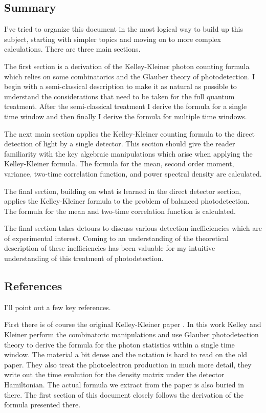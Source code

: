 \documentclass[12pt]{article}
\begin{document}
\subsection{Summary}

I've tried to organize this document in the most logical way to build up this subject, starting with simpler topics and moving on to more complex calculations. There are three main sections. 

The first section is a derivation of the Kelley-Kleiner photon counting formula which relies on some combinatorics and the Glauber theory of photodetection. I begin with a semi-classical description to make it as natural as possible to understand the considerations that need to be taken for the full quantum treatment. After the semi-classical treatment I derive the formula for a single time window and then finally I derive the formula for multiple time windows.

The next main section applies the Kelley-Kleiner counting formula to the direct detection of light by a single detector. This section should give the reader familiarity with the key algebraic manipulations which arise when applying the Kelley-Kleiner formula. The formula for the mean, second order moment, variance, two-time correlation function, and power spectral density are calculated.

The final section, building on what is learned in the direct detector section, applies the Kelley-Kleiner formula to the problem of balanced photodetection. The formula for the mean and two-time correlation function is calculated.

The final section takes detours to discuss various detection inefficiencies which are of experimental interest. Coming to an understanding of the theoretical description of these inefficiencies has been valuable for my intuitive understanding of this treatment of photodetection.

\subsection{References}

I'll point out a few key references.

First there is of course the original Kelley-Kleiner paper \cite{Kelley1964}. In this work Kelley and Kleiner perform the combinatoric manipulations and use Glauber photodetection theory \cite{Glauber1963} to derive the formula for the photon statistics within a single time window. The material a bit dense and the notation is hard to read on the old paper. They also treat the photoelectron production in much more detail, they write out the time evolution for the density matrix under the detector Hamiltonian. The actual formula we extract from the paper is also buried in there. The first section of this document closely follows the derivation of the formula presented there.
\end{document}
